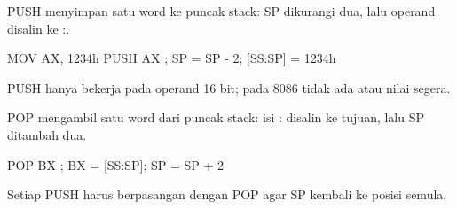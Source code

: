 \documentclass[aspectratio=169,11pt]{beamer}
\begin{document}
\begin{frame}[fragile]{PUSH}
\small
{} menyimpan satu word ke puncak stack:
SP dikurangi dua, lalu operand disalin ke :.

\vspace{0.2em}
\begin{kodeasm}[numbers=none]
MOV AX, 1234h
PUSH AX             ; SP = SP - 2; [SS:SP] = 1234h
\end{kodeasm}

\vspace{0.15em}
{\footnotesize\color{obeGray}PUSH hanya bekerja pada operand 16 bit;
pada 8086 tidak ada  atau nilai segera.\par}
\end{frame}

\begin{frame}[fragile]{POP}
\small
{} mengambil satu word dari puncak stack:
isi : disalin ke tujuan, lalu SP ditambah dua.

\vspace{0.2em}
\begin{kodeasm}[numbers=none]
POP BX              ; BX = [SS:SP]; SP = SP + 2
\end{kodeasm}

\vspace{0.15em}
{\footnotesize\color{obeGray}Setiap PUSH harus berpasangan dengan
POP agar SP kembali ke posisi semula.\par}
\end{frame}
\end{document}
